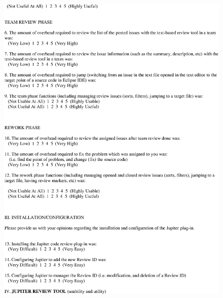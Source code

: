 \begin{figure}[htbp]
  \centering
  \includegraphics{images/appndx-4-4.eps}
  \label{appndx-4-4}
\end{figure}

